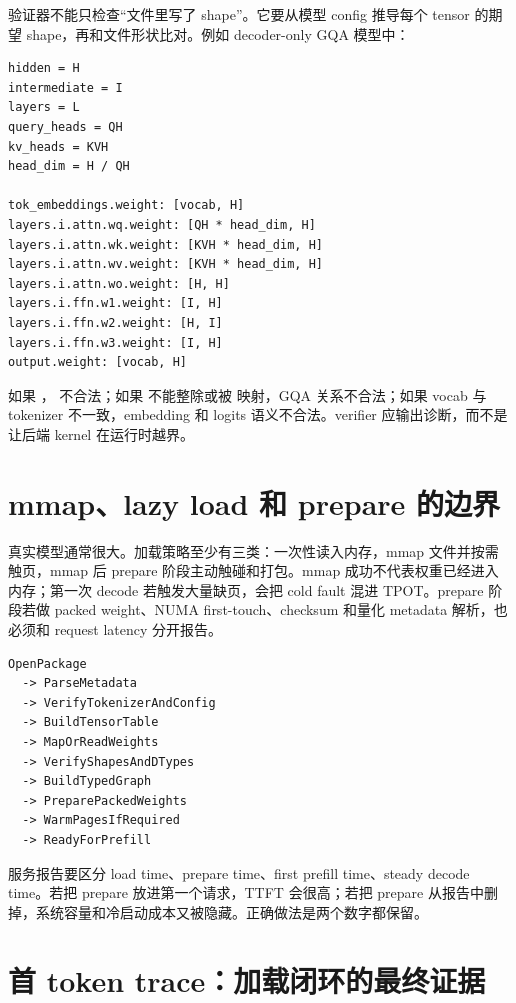 验证器不能只检查“文件里写了 shape”。它要从模型 config 推导每个 tensor 的期望 shape，再和文件形状比对。例如 decoder-only GQA 模型中：

\begin{lstlisting}[numbers=none,caption={LLaMA-like shape 推导}]
hidden = H
intermediate = I
layers = L
query_heads = QH
kv_heads = KVH
head_dim = H / QH

tok_embeddings.weight: [vocab, H]
layers.i.attn.wq.weight: [QH * head_dim, H]
layers.i.attn.wk.weight: [KVH * head_dim, H]
layers.i.attn.wv.weight: [KVH * head_dim, H]
layers.i.attn.wo.weight: [H, H]
layers.i.ffn.w1.weight: [I, H]
layers.i.ffn.w2.weight: [H, I]
layers.i.ffn.w3.weight: [I, H]
output.weight: [vocab, H]
\end{lstlisting}

如果 ， 不合法；如果  不能整除或被  映射，GQA 关系不合法；如果 vocab 与 tokenizer 不一致，embedding 和 logits 语义不合法。verifier 应输出诊断，而不是让后端 kernel 在运行时越界。

\section{mmap、lazy load 和 prepare 的边界}

真实模型通常很大。加载策略至少有三类：一次性读入内存，mmap 文件并按需触页，mmap 后 prepare 阶段主动触碰和打包。mmap 成功不代表权重已经进入内存；第一次 decode 若触发大量缺页，会把 cold fault 混进 TPOT。prepare 阶段若做 packed weight、NUMA first-touch、checksum 和量化 metadata 解析，也必须和 request latency 分开报告。

\begin{lstlisting}[numbers=none,caption={加载阶段边界}]
OpenPackage
  -> ParseMetadata
  -> VerifyTokenizerAndConfig
  -> BuildTensorTable
  -> MapOrReadWeights
  -> VerifyShapesAndDTypes
  -> BuildTypedGraph
  -> PreparePackedWeights
  -> WarmPagesIfRequired
  -> ReadyForPrefill
\end{lstlisting}

服务报告要区分 load time、prepare time、first prefill time、steady decode time。若把 prepare 放进第一个请求，TTFT 会很高；若把 prepare 从报告中删掉，系统容量和冷启动成本又被隐藏。正确做法是两个数字都保留。

\section{首 token trace：加载闭环的最终证据}

